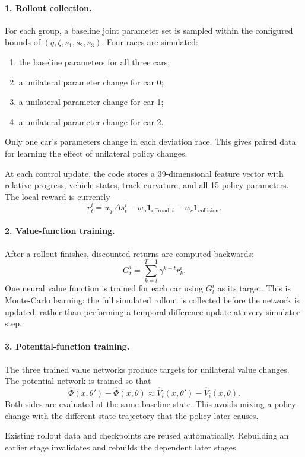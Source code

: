 \documentclass[11pt]{article}
\begin{document}
\paragraph{1. Rollout collection.}
For each group, a baseline joint parameter set is sampled within the configured
bounds of $(q,\zeta,s_1,s_2,s_3)$. Four races are simulated:
\begin{enumerate}
  \item the baseline parameters for all three cars;
  \item a unilateral parameter change for car 0;
  \item a unilateral parameter change for car 1;
  \item a unilateral parameter change for car 2.
\end{enumerate}
Only one car's parameters change in each deviation race. This gives paired data
for learning the effect of unilateral policy changes.

At each control update, the code stores a 39-dimensional feature vector with
relative progress, vehicle states, track curvature, and all 15 policy
parameters. The local reward is currently
\[
  r^i_t=w_p\Delta s^i_t
  -w_o\mathbf{1}_{\mathrm{offroad},i}
  -w_c\mathbf{1}_{\mathrm{collision}}.
\]

\paragraph{2. Value-function training.}
After a rollout finishes, discounted returns are computed backwards:
\[
  G^i_t=\sum_{k=t}^{T-1}\gamma^{k-t}r^i_k.
\]
One neural value function is trained for each car using $G^i_t$ as its target.
This is Monte-Carlo learning: the full simulated rollout is collected before
the network is updated, rather than performing a temporal-difference update at
every simulator step.

\paragraph{3. Potential-function training.}
The three trained value networks produce targets for unilateral value changes.
The potential network is trained so that
\[
  \widehat\Phi(x,\theta')-\widehat\Phi(x,\theta)
  \approx
  \widehat V_i(x,\theta')-\widehat V_i(x,\theta).
\]
Both sides are evaluated at the same baseline state. This avoids mixing a policy
change with the different state trajectory that the policy later causes.

Existing rollout data and checkpoints are reused automatically. Rebuilding an
earlier stage invalidates and rebuilds the dependent later stages.
\end{document}
